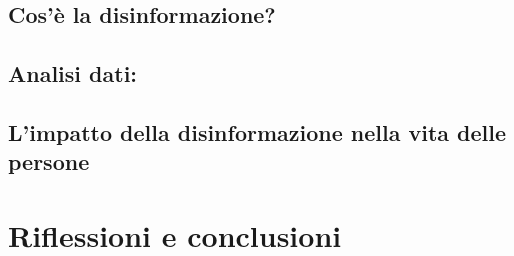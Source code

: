 \documentclass{article}
\begin{document}
\flushleft \subsection{Cos'è la disinformazione?}

\flushleft \subsection{Analisi dati:}

\flushleft \subsection{L'impatto della disinformazione nella vita delle persone}

\centering
\newpage\section{Riflessioni e conclusioni}
\end{document}
